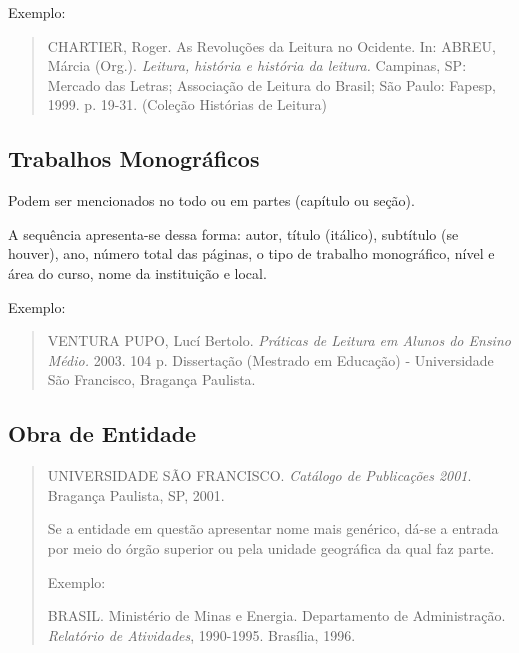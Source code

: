 \documentclass[
	12pt,				%
	openright,			%
	oneside,			%
	a4paper,			%
	english,			%
	french,				%
	spanish,			%
	brazil				%
	]{abntex2}
\begin{document}
\par Exemplo: 

\begin{quote}
CHARTIER, Roger. As Revoluções da Leitura no Ocidente. In: ABREU, Márcia (Org.). \textit{Leitura, história e história da leitura.} Campinas, SP: Mercado das Letras; Associação de Leitura do Brasil; São Paulo: Fapesp, 1999. p. 19-31. (Coleção Histórias de Leitura) 
\end{quote}

\subsection{Trabalhos Monográficos}

\par Podem ser mencionados no todo ou em partes (capítulo ou seção). 
\par A sequência apresenta-se dessa forma: autor, título (itálico), subtítulo (se houver),  ano,  número total das páginas, o tipo de trabalho monográfico, nível e área do curso, nome da instituição e local.

\par Exemplo:

\begin{quote}
VENTURA PUPO,  Lucí Bertolo. \textit{Práticas de Leitura em Alunos do Ensino Médio.} 2003. 104 p. Dissertação (Mestrado em Educação) - Universidade São Francisco, Bragança Paulista.
\end{quote}


\subsection{Obra de Entidade}
\begin{quote}
\par UNIVERSIDADE SÃO FRANCISCO. \textit{Catálogo de Publicações 2001}. Bragança Paulista, SP, 2001.

\par Se a entidade em questão apresentar nome mais genérico, dá-se a entrada por meio do órgão superior ou pela unidade geográfica da qual faz parte.

\par Exemplo:

\par BRASIL. Ministério de Minas e Energia. Departamento de Administração. \textit{Relatório de Atividades}, 1990-1995. Brasília, 1996.

\end{quote}
\end{document}
